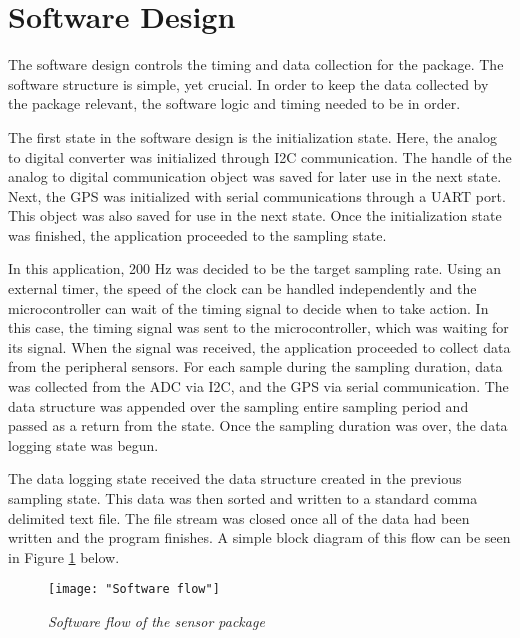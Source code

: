 \section{Software Design}
The software design controls the timing and data collection for the package. The software structure is simple, yet crucial. In order to keep the data collected by the package relevant, the software logic and timing needed to be in order. 

The first state in the software design is the initialization state. Here, the analog to digital converter was initialized through I2C communication. The handle of the analog to digital communication object was saved for later use in the next state. Next, the GPS was initialized with serial communications through a UART port. This object was also saved for use in the next state. Once the initialization state was finished, the application proceeded to the sampling state.

In this application, 200 Hz was decided to be the target sampling rate. Using an external timer, the speed of the clock can be handled independently and the microcontroller can wait of the timing signal to decide when to take action. In this case, the timing signal was sent to the microcontroller, which was waiting for its signal. When the signal was received, the application proceeded to collect data from the peripheral sensors. For each sample during the sampling duration, data was collected from the ADC via I2C, and the GPS via serial communication. The data structure was appended over the sampling entire sampling period and passed as a return from the state. Once the sampling duration was over, the data logging state was begun. 

The data logging state received the data structure created in the previous sampling state. This data was then sorted and written to a standard comma delimited text file. The file stream was closed once all of the data had been written and the program finishes. A simple block diagram of this flow can be seen in Figure \ref{fig:PRO_SoftFlow} below.

\begin{figure}[H]
\centering
\texttt{[image: "Software flow"]}
\caption{\textit{Software flow of the sensor package}}
\label{fig:PRO_SoftFlow}
\end{figure}